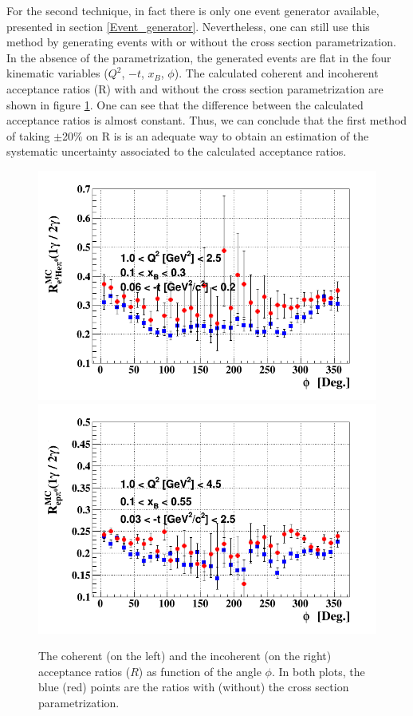 For the second technique, in fact there is only one event generator available, 
presented in section \ref{Event_generator}. Nevertheless, one can still use 
this method by generating events with or without the cross section 
parametrization. In the absence of the parametrization, the generated events 
are flat in the four kinematic variables ($Q^2$, $-t$, $x_B$, $\phi$). The 
calculated coherent and incoherent acceptance ratios (R) with and without the 
cross section parametrization are shown in figure 
\ref{fig:accep_ratio_sys_uncer}. One can see that the difference between the 
calculated acceptance ratios is almost constant. Thus, we can conclude that the 
first method of taking $\pm$20$\%$ on R is is an adequate way to obtain an 
estimation of the systematic uncertainty associated to the calculated 
acceptance ratios.
\begin{figure}[h!]
\includegraphics[scale=0.34]{fig_results/coh_accp_ratio_phi.png}
\includegraphics[scale=0.34]{fig_results/incoh_accp_ratio_phi.png}
\caption{The coherent (on the left) and the incoherent (on the right) 
acceptance ratios ($R$) as function of the angle $\phi$. In both plots, the 
blue (red) points are the ratios with (without) the cross section 
parametrization.} \label{fig:accep_ratio_sys_uncer}
\end{figure}

